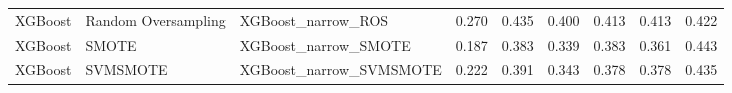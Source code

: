 \begin{tabular}{lllllllll}
                     XGBoost & Random Oversampling &                           XGBoost\_narrow\_ROS & 0.270 &                     0.435 &                 0.400 &                  0.413 &                                   0.413 &     0.422 \\
                     XGBoost &               SMOTE &                         XGBoost\_narrow\_SMOTE & 0.187 &                     0.383 &                 0.339 &                  0.383 &                                   0.361 &     0.443 \\
                     XGBoost &            SVMSMOTE &                      XGBoost\_narrow\_SVMSMOTE & 0.222 &                     0.391 &                 0.343 &                  0.378 &                                   0.378 &     0.435 \\
\bottomrule
\end{tabular}
